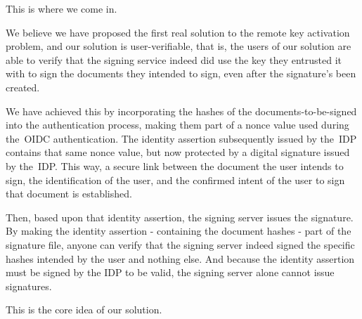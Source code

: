 This is where we come in.

We believe we have proposed the first real solution to the remote key activation problem,
and our solution is user-verifiable,
that is,
the users of our solution are able to verify that the signing service indeed did use the key they entrusted it with to sign the documents they intended to sign,
even after the signature's been created.

We have achieved this by incorporating the hashes of the documents-to-be-signed into the authentication process,
making them part of a nonce value used during the~\gls{OIDC} authentication.
The identity assertion subsequently issued by the~\gls{IDP} contains that same nonce value,
but now protected by a digital signature issued by the~\gls{IDP}.
This way, a secure link between the document the user intends to sign,
the identification of the user,
and the confirmed intent of the user to sign that document is established.

Then, based upon that identity assertion, the signing server issues the signature.
By making the identity assertion - containing the document hashes - part of the signature file,
anyone can verify that the signing server indeed signed the specific hashes intended by the user and nothing else.
And because the identity assertion must be signed by the \gls{IDP} to be valid,
the signing server alone cannot issue signatures.

This is the core idea of our solution.
